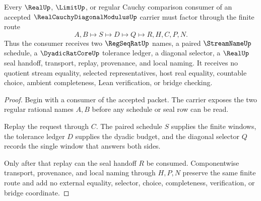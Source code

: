 \begin{theorem}
\label{thm:real-cauchy-diagonal-modulus-window-extraction}
Every $\RealUp$, $\LimitUp$, or regular Cauchy comparison consumer of an accepted $\RealCauchyDiagonalModulusUp$ carrier must factor through the finite route
$$
A,B \longmapsto S \longmapsto D \longmapsto Q \longmapsto R,H,C,P,N .
$$
Thus the consumer receives two $\RegSeqRatUp$ names, a paired $\StreamNameUp$ schedule, a $\DyadicRatCoreUp$ tolerance ledger, a diagonal selector, a $\RealUp$ seal handoff, transport, replay, provenance, and local naming. It receives no quotient stream equality, selected representatives, host real equality, countable choice, ambient completeness, Lean verification, or bridge checking.
\end{theorem}
\begin{proof}
Begin with a consumer of the accepted packet. The carrier exposes the two regular rational names $A,B$ before any schedule or seal row can be read.

Replay the request through $C$. The paired schedule $S$ supplies the finite windows, the tolerance ledger $D$ supplies the dyadic budget, and the diagonal selector $Q$ records the single window that answers both sides.

Only after that replay can the seal handoff $R$ be consumed. Componentwise transport, provenance, and local naming through $H,P,N$ preserve the same finite route and add no external equality, selector, choice, completeness, verification, or bridge coordinate.
\end{proof}


\begin{closurestatus}{\RealCauchyDiagonalModulusUp}
  \theoryclosure{\seedClosure}
  \formalstatus{\unformalizedV}
\end{closurestatus}
